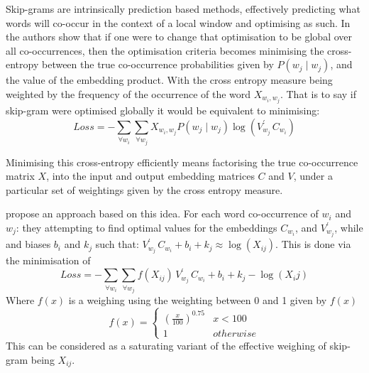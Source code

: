\documentclass[parskip]{komatufte}
\begin{document}


Skip-grams are intrinsically prediction based methods, effectively predicting what words will co-occur in the context of a local window and optimising as such.
In  the authors show that if one were to change that optimisation to be global over all co-occurrences,
then the optimisation criteria becomes minimising the cross-entropy between the true co-occurrence probabilities given by $P(w_j\mid w_j)$, and the value of the embedding product.
With the cross entropy measure being weighted by the frequency of the occurrence of the word $X_{w_i,w_j}$.
That is to say if skip-gram were optimised globally it would be equivalent to minimising:
\begin{equation}
Loss = - \sum_{\forall w_i} \sum_{\forall w_j} X_{w_i,w_j} P(w_j\mid w_j) \log (V_{w_j}^\prime\,C_{w_{i}})
\end{equation}


Minimising this cross-entropy efficiently means  factorising the true co-occurrence matrix $X$,
into the input and output embedding matrices $C$ and $V$, under a particular set of weightings given by the cross entropy measure.



\textcite{pennington2014glove} propose an approach based on this idea.
For each word co-occurrence of $w_i$ and $w_j$: they attempting to find optimal values for 
the embeddings $C_{w_{i}}$, and $V_{w_j}^\prime$, while and biases $b_i$ and $k_j$
such that:
$V_{w_j}^\prime\,C_{w_{i}} + b_i + k_j \approx \log(X_{ij})$.
This is done via the minimisation of 
\begin{equation}
Loss = - \sum_{\forall w_i}  \sum_{\forall w_j} f(X_{ij})\,V_{w_j}^\prime\,C_{w_{i}}+b_i+k_j-\log (X_ij)
\end{equation}
Where $f(x)$ is a weighing using the weighting between 0 and 1 given by $f(x)$
\begin{equation}
f(x)=\begin{cases}
\left(\frac{x}{100}\right)^{0.75} & x<100\\
1 & otherwise
\end{cases}
\end{equation}
This can be considered as a saturating variant of the effective weighing of skip-gram being $X_{ij}$.
\end{document}
